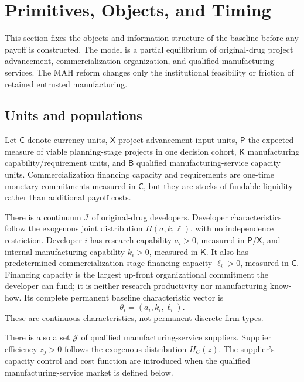 \section{Primitives, Objects, and Timing}
\label{sec:p01-primitives-timing}

This section fixes the objects and information structure of the baseline before
any payoff is constructed.  The model is a partial equilibrium of
original-drug project advancement, commercialization organization, and
qualified manufacturing services.  The MAH reform changes only the
institutional feasibility or friction of retained entrusted manufacturing.

\subsection{Units and populations}
\label{subsec:p01-units-populations}

Let \(\mathsf C\) denote currency units, \(\mathsf X\) project-advancement
input units, \(\mathsf P\) the expected measure of viable planning-stage
projects in one decision cohort, \(\mathsf K\) manufacturing
capability/requirement units, and \(\mathsf B\) qualified manufacturing-service
capacity units. Commercialization financing capacity and requirements are
one-time monetary commitments measured in \(\mathsf C\), but they are stocks
of fundable liquidity rather than additional payoff costs.

There is a continuum \(\mathcal I\) of original-drug developers.  Developer
characteristics follow the exogenous joint distribution \(H(a,k,\ell)\), with
no independence restriction. Developer \(i\)
has research capability \(a_i>0\), measured in \(\mathsf P/\mathsf X\), and
internal manufacturing capability \(k_i>0\), measured in \(\mathsf K\). It
also has predetermined commercialization-stage financing capacity
\(\ell_i>0\), measured in \(\mathsf C\). Financing capacity is the largest
up-front organizational commitment the developer can fund; it is neither
research productivity nor manufacturing know-how. Its
complete permanent baseline characteristic vector is
\begin{equation}
  \theta_i=(a_i,k_i,\ell_i).
  \label{eq:p01-developer-type}
\end{equation}
These are continuous characteristics, not permanent discrete firm types.

There is also a set \(\mathcal J\) of qualified manufacturing-service
suppliers.  Supplier efficiency \(z_j>0\) follows the exogenous distribution
\(H_C(z)\).  The supplier's capacity control and cost function are introduced
when the qualified manufacturing-service market is defined below.

